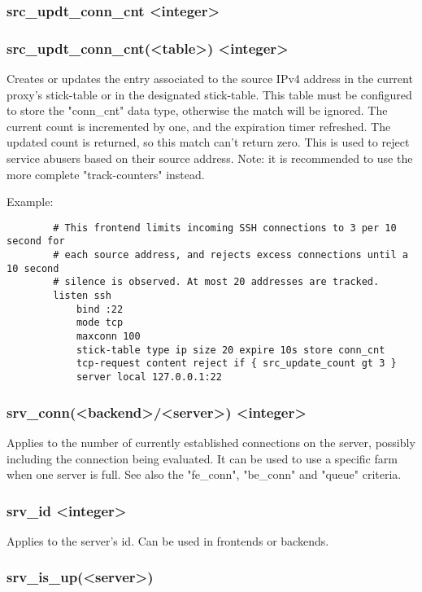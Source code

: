 \subsubsection[src\_updt\_conn\_cnt]{src\_updt\_conn\_cnt <integer>}
\subsubsection*{src\_updt\_conn\_cnt(<table>) <integer>}
  Creates or updates the entry associated to the source IPv4 address in the
  current proxy's stick-table or in the designated stick-table. This table
  must be configured to store the "conn\_cnt" data type, otherwise the match
  will be ignored. The current count is incremented by one, and the expiration
  timer refreshed. The updated count is returned, so this match can't return
  zero. This is used to reject service abusers based on their source address.
  Note: it is recommended to use the more complete "track-counters" instead.

  Example:
  \begin{verbatim}
        # This frontend limits incoming SSH connections to 3 per 10 second for
        # each source address, and rejects excess connections until a 10 second
        # silence is observed. At most 20 addresses are tracked.
        listen ssh
            bind :22
            mode tcp
            maxconn 100
            stick-table type ip size 20 expire 10s store conn_cnt
            tcp-request content reject if { src_update_count gt 3 }
            server local 127.0.0.1:22
  \end{verbatim}

\subsubsection[srv\_conn]{srv\_conn(<backend>/<server>) <integer>}
  Applies to the number of currently established connections on the server,
  possibly including the connection being evaluated.
  It can be used to use a specific farm when one server is full.
  See also the "fe\_conn", "be\_conn" and "queue" criteria.

\subsubsection[srv\_id]{srv\_id <integer>}
  Applies to the server's id. Can be used in frontends or backends.

\subsubsection[srv\_is\_up]{srv\_is\_up(<server>)}
